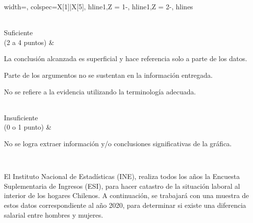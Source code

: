 \documentclass{caes}
\begin{document}
\begin{center}
\begin{tblr}{width=\linewidth, colspec={X[1]|X[5]}, hline{1,Z} = {1}{-}{}, hline{1,Z} = {2}{-}{}, hlines}
\begin{enu_tabla}
    \end{enu_tabla}\\
    {Suficiente\\ (2 a 4 puntos)} & 
    \begin{enu_tabla}
        \item La conclusión alcanzada es superficial y hace referencia solo a parte de los datos.
        \item Parte de los argumentos no se sustentan en la información entregada.
        \item No se refiere a la evidencia utilizando la terminología adecuada.
    \end{enu_tabla}\\
    {Insuficiente\\ (0 o 1 punto)} & 
    \begin{enu_tabla}
        \item No se logra extraer información y/o conclusiones significativas de la gráfica.
    \end{enu_tabla}\\

\end{tblr}    
\end{center}

\newpage

\parte El Instituto Nacional de Estadísticas (INE), realiza todos los años la 
Encuesta Suplemen\-taria de In\-gresos (ESI), para hacer catastro de la situación laboral
al interior de los hogares Chilenos. A con\-tinuación, se trabajará con una muestra de 
estos datos correspondiente al año 2020, para determinar si existe una diferencia 
salarial entre hombres y mujeres.
\end{document}
